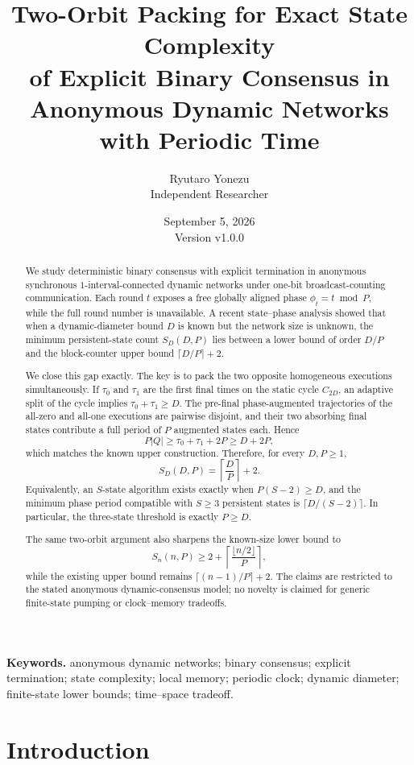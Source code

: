 \documentclass[11pt]{article}
\title{\textbf{Two-Orbit Packing for Exact State Complexity\\of Explicit Binary Consensus in Anonymous Dynamic Networks\\with Periodic Time}}
\author{Ryutaro Yonezu\\\small Independent Researcher}
\date{September 5, 2026\\\small Version v1.0.0}
\theoremstyle{remark}
\begin{document}
\maketitle

\begin{abstract}
We study deterministic binary consensus with explicit termination in anonymous synchronous $1$-interval-connected dynamic networks under one-bit broadcast-counting communication.  Each round $t$ exposes a free globally aligned phase $\phi_t=t\bmod P$, while the full round number is unavailable.  A recent state--phase analysis showed that when a dynamic-diameter bound $D$ is known but the network size is unknown, the minimum persistent-state count $S_D(D,P)$ lies between a lower bound of order $D/P$ and the block-counter upper bound $\lceil D/P\rceil+2$.

We close this gap exactly.  The key is to pack the two opposite homogeneous executions simultaneously.  If $\tau_0$ and $\tau_1$ are the first final times on the static cycle $C_{2D}$, an adaptive split of the cycle implies $\tau_0+\tau_1\ge D$.  The pre-final phase-augmented trajectories of the all-zero and all-one executions are pairwise disjoint, and their two absorbing final states contribute a full period of $P$ augmented states each.  Hence
\[
P|Q|\ge \tau_0+\tau_1+2P\ge D+2P,
\]
which matches the known upper construction.  Therefore, for every $D,P\ge1$,
\[
\boxed{S_D(D,P)=\left\lceil\frac{D}{P}\right\rceil+2.}
\]
Equivalently, an $S$-state algorithm exists exactly when $P(S-2)\ge D$, and the minimum phase period compatible with $S\ge3$ persistent states is $\lceil D/(S-2)\rceil$.  In particular, the three-state threshold is exactly $P\ge D$.

The same two-orbit argument also sharpens the known-size lower bound to
\[
S_n(n,P)\ge 2+\left\lceil\frac{\lfloor n/2\rfloor}{P}\right\rceil,
\]
while the existing upper bound remains $\lceil(n-1)/P\rceil+2$.  The claims are restricted to the stated anonymous dynamic-consensus model; no novelty is claimed for generic finite-state pumping or clock--memory tradeoffs.
\end{abstract}

\noindent\textbf{Keywords.} anonymous dynamic networks; binary consensus; explicit termination; state complexity; local memory; periodic clock; dynamic diameter; finite-state lower bounds; time--space tradeoff.

\section{Introduction}
\end{document}
